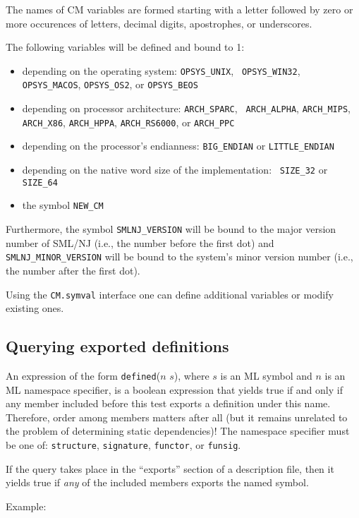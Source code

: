 \documentclass[titlepage,letterpaper]{article}
\begin{document}
The names of CM variables are formed starting with a letter followed
by zero or more occurences of letters, decimal digits, apostrophes, or
underscores.

The following variables will be defined and bound to 1:
\begin{itemize}
\item depending on the operating system: {\tt OPSYS\_UNIX}, {\tt
OPSYS\_WIN32}, {\tt OPSYS\_MACOS}, {\tt OPSYS\_OS2}, or \linebreak
{\tt OPSYS\_BEOS}
\item depending on processor architecture: {\tt ARCH\_SPARC}, {\tt
ARCH\_ALPHA}, {\tt ARCH\_MIPS}, {\tt ARCH\_X86}, {\tt ARCH\_HPPA},
{\tt ARCH\_RS6000}, or {\tt ARCH\_PPC}
\item depending on the processor's endianness: {\tt BIG\_ENDIAN} or
{\tt LITTLE\_ENDIAN}
\item depending on the native word size of the implementation: {\tt
SIZE\_32} or {\tt SIZE\_64}
\item the symbol {\tt NEW\_CM}
\end{itemize}

Furthermore, the symbol {\tt SMLNJ\_VERSION} will be bound to the
major version number of SML/NJ (i.e., the number before the first dot)
and {\tt SMLNJ\_MINOR\_VERSION} will be bound to the system's minor
version number (i.e., the number after the first dot).

Using the {\tt CM.symval} interface one can define additional
variables or modify existing ones.

\subsection{Querying exported definitions}

An expression of the form {\tt defined}($n$ $s$), where $s$ is an ML
symbol and $n$ is an ML namespace specifier, is a boolean expression
that yields true if and only if any member included before this test
exports a definition under this name.  Therefore, order among members
matters after all (but it remains unrelated to the problem of
determining static dependencies)!  The namespace specifier must be one
of: {\tt structure}, {\tt signature}, {\tt functor}, or {\tt funsig}.

If the query takes place in the ``exports'' section of a description
file, then it yields true if {\em any} of the included members exports
the named symbol.

\noindent Example:
\end{document}

